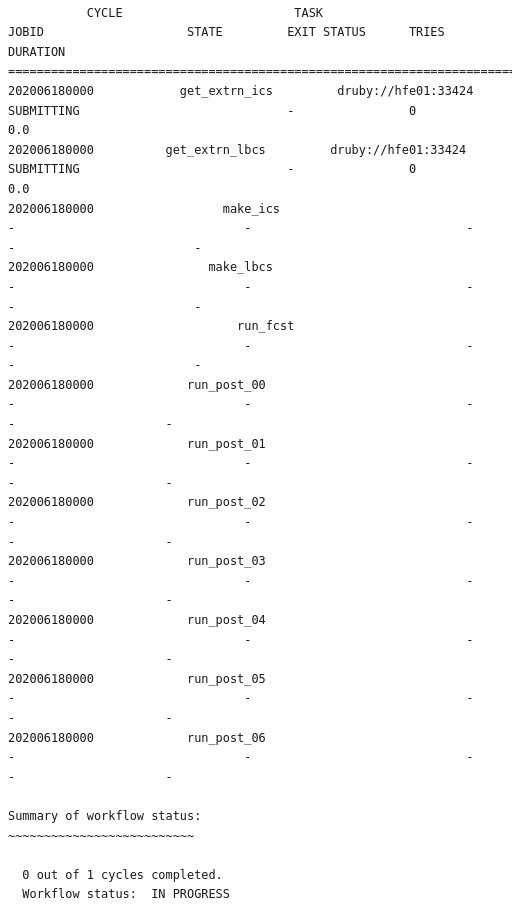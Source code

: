 \documentclass[11pt,fleqn]{report}              %
\begin{document}
\lstset{language=bash}   
\begin{lstlisting}[frame=trBL, basicstyle=\tiny]

           CYCLE                        TASK                                JOBID                    STATE         EXIT STATUS      TRIES         DURATION
====================================================================================================
202006180000            get_extrn_ics         druby://hfe01:33424          SUBMITTING                             -                0                       0.0
202006180000          get_extrn_lbcs         druby://hfe01:33424          SUBMITTING                             -                0                       0.0
202006180000                  make_ics                                       -                                -                              -                -              	        -
202006180000                make_lbcs                                       -                                -                              -                -                         -
202006180000                    run_fcst                                       -                                -                              -                -                         -
202006180000             run_post_00                                       -                                -                              -                -           	      -
202006180000             run_post_01                                       -                                -                              -                -            	      -
202006180000             run_post_02                                       -                                -                              -                -            	      -
202006180000             run_post_03                                       -                                -                              -                -            	      -
202006180000             run_post_04                                       -                                -                              -                -            	      -
202006180000             run_post_05                                       -                                -                              -                -            	      -
202006180000             run_post_06                                       -                                -                              -                -            	      -

Summary of workflow status:
~~~~~~~~~~~~~~~~~~~~~~~~~~

  0 out of 1 cycles completed.
  Workflow status:  IN PROGRESS

\end{lstlisting}
\end{document}
